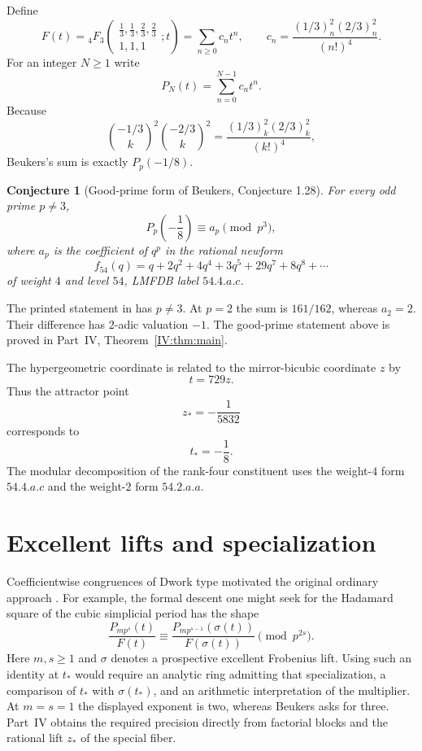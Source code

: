 \documentclass[11pt,letterpaper]{article}
\newtheorem{conjecture}[theorem]{Conjecture}
\theoremstyle{definition}
\theoremstyle{remark}
\begin{document}
Define
\[
 F(t)={}_4F_3\!\left(
 \begin{matrix}\frac13,\frac13,\frac23,\frac23\\1,1,1\end{matrix};t\right)
 =\sum_{n\ge0}c_nt^n,
 \qquad
 c_n=\frac{(1/3)_n^2(2/3)_n^2}{(n!)^4}.
\]
For an integer $N\ge1$ write
\[
 P_N(t)=\sum_{n=0}^{N-1}c_nt^n.
\]
Because
\[
 \binom{-1/3}{k}^2\binom{-2/3}{k}^2
 =\frac{(1/3)_k^2(2/3)_k^2}{(k!)^4},
\]
Beukers's sum is exactly $P_p(-1/8)$.

\begin{conjecture}[Good-prime form of Beukers, Conjecture 1.28]\label{III:conj:beukers}
For every odd prime $p\neq3$,
\[
 P_p\!\left(-\frac18\right)\equiv a_p\pmod{p^3},
\]
where $a_p$ is the coefficient of $q^p$ in the rational newform
\[
 f_{54}(q)=q+2q^2+4q^4+3q^5+29q^7+8q^8+\cdots
\]
of weight $4$ and level $54$, LMFDB label $54.4.a.c$.
\end{conjecture}


The printed statement in \cite[Conjecture~1.28]{III:Beukers2026} has
$p\ne3$. At $p=2$ the sum is $161/162$, whereas $a_2=2$.
Their difference has $2$-adic valuation $-1$. The good-prime statement
above is proved in Part~IV, Theorem~\ref{IV:thm:main}.

The hypergeometric coordinate is related to the mirror-bicubic coordinate $z$ by
\[
 t=729z.
\]
Thus the attractor point
\[
 z_*=-\frac1{5832}
\]
corresponds to
\[
 t_*=-\frac18.
\]
The modular decomposition of the rank-four constituent uses the weight-$4$ form $54.4.a.c$ and the weight-$2$ form
$54.2.a.a$.


\section{Excellent lifts and specialization}

Coefficientwise congruences of Dwork type motivated the original
ordinary approach \cite{III:BV3,III:CompleteEdition}. For example, the
formal descent one might seek for the Hadamard square of the cubic
simplicial period has the shape
\[
 \frac{P_{mp^s}(t)}{F(t)}\equiv
 \frac{P_{mp^{s-1}}(\sigma(t))}{F(\sigma(t))}
 \pmod{p^{2s}} .
\]
Here $m,s\ge1$ and $\sigma$ denotes a prospective excellent
Frobenius lift. Using such an identity at $t_*$ would require an
analytic ring admitting that specialization, a comparison of $t_*$
with $\sigma(t_*)$, and an arithmetic interpretation of the
multiplier. At $m=s=1$ the displayed exponent is two,
whereas Beukers asks for three. Part~IV obtains the required
precision directly from factorial blocks and the rational lift
$z_*$ of the special fiber.
\end{document}
